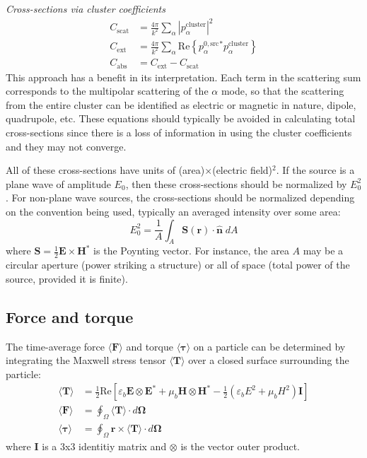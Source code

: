 \documentclass[11pt]{article}
\begin{document}
\hfill

\textit{Cross-sections via cluster coefficients} \cite{xu1995electromagnetic}
\begin{subequations}
\begin{align}
    C_\text{scat} &= \frac{4\pi}{k^2} \sum_{\alpha}
        |p_{\alpha}^\text{cluster}|^2 \\
    C_\text{ext} &= \frac{4\pi}{k^2} \sum_{\alpha}
    \text{Re} \left\{ p_\alpha^{0,\text{src}}^* p_\alpha^\text{cluster} \right\} \\
    C_\text{abs} &= C_\text{ext} - C_\text{scat}
\end{align}
\end{subequations}
This approach has a benefit in its interpretation.
Each term in the scattering sum corresponds to the multipolar scattering of the  $\alpha$ mode, so that the scattering from the entire cluster can be identified as electric or magnetic in nature, dipole, quadrupole, etc.
These equations should typically be avoided in calculating total cross-sections since there is a loss of information in using the cluster coefficients and they may not converge.

All of these cross-sections have units of (area)$\times$(electric field)$^2$.
If the source is a plane wave of amplitude $E_0$, then these cross-sections should be normalized by $E_0^2$.
For non-plane wave sources, the cross-sections should be normalized depending on the convention being used, typically an averaged intensity over some area:
\begin{equation}
    E_0^2 = \frac{1}{A} \int_A \boldsymbol{S}(\boldsymbol{r}) 
    \cdot \bm{\hat n} \;dA
\end{equation}
where $\bm{S} = \frac{1}{2} \bm{E} \times \bm{H^*}$ is the Poynting vector.
For instance, the area $A$ may be a circular aperture (power striking a structure) or all of space (total power of the source, provided it is finite).

\subsection{Force and torque}
\newcommand{\mst}{\langle \boldsymbol{T} \rangle}

The time-average force $\langle \bm{F} \rangle$ and torque $\langle \bm{\tau} \rangle$ on a particle can be determined by integrating the Maxwell stress tensor $\mst$ over a closed surface surrounding the particle: \cite{mst}
\begin{subequations}
\begin{align}
    \mst &= \frac{1}{2} \text{Re} \left[ \varepsilon_b  \boldsymbol{E} \otimes \boldsymbol{E^*} + \mu_b \boldsymbol{H} \otimes \boldsymbol{H^*}
    - \frac{1}{2}(\varepsilon_b E^2 + \mu_b H^2)\boldsymbol{I} \right] \\
    \langle \boldsymbol{F} \rangle &= \oint_\Omega \mst \cdot d \boldsymbol{\Omega} \\
    \langle \boldsymbol{\tau} \rangle &= \oint_\Omega \boldsymbol{r} \times \mst \cdot d \boldsymbol{\Omega}
\end{align}
\end{subequations}
where $\bm{I}$ is a 3x3 identitiy matrix and $\otimes$ is the vector outer product.
\end{document}
